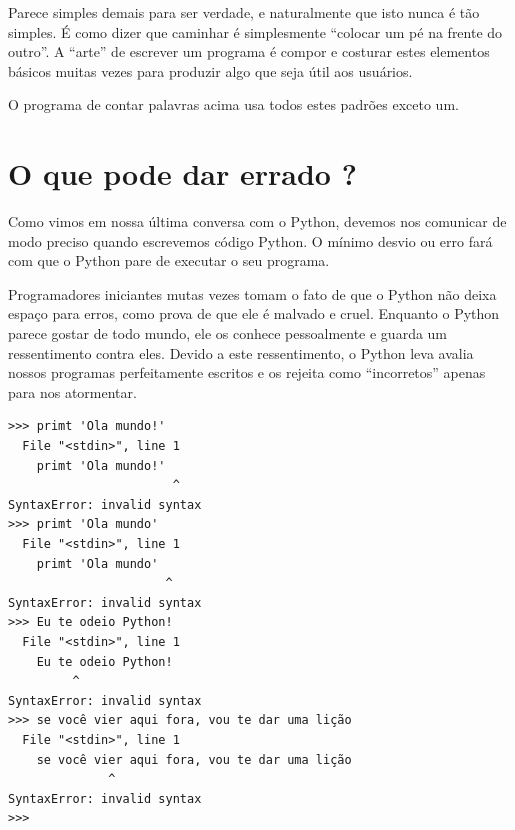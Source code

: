 Parece simples demais para ser verdade, e naturalmente que isto nunca
é tão simples. É como dizer que caminhar é simplesmente ``colocar
um pé na frente do outro''. A ``arte'' de escrever um programa é
compor e costurar estes elementos básicos muitas vezes para produzir
algo que seja útil aos usuários.
%

O programa de contar palavras acima usa todos estes padrões exceto um.
%

\section{O que pode dar errado ?}
%

Como vimos em nossa última conversa com o Python, devemos nos comunicar
de modo preciso quando escrevemos código Python. O mínimo desvio ou erro
fará com que o Python pare de executar o seu programa. 
%

Programadores iniciantes mutas vezes tomam o fato de que o Python não deixa
espaço para erros, como prova de que ele é malvado e cruel.
Enquanto o Python parece gostar de todo mundo, ele os conhece pessoalmente e
guarda um ressentimento contra eles. Devido a este ressentimento, o Python
leva avalia nossos programas perfeitamente escritos e os rejeita como ``incorretos''
apenas para nos atormentar.
%

\beforeverb
\begin{verbatim}
>>> primt 'Ola mundo!'
  File "<stdin>", line 1
    primt 'Ola mundo!'
                       ^
SyntaxError: invalid syntax
>>> primt 'Ola mundo'
  File "<stdin>", line 1
    primt 'Ola mundo'
                      ^
SyntaxError: invalid syntax
>>> Eu te odeio Python!
  File "<stdin>", line 1
    Eu te odeio Python!
         ^
SyntaxError: invalid syntax
>>> se você vier aqui fora, vou te dar uma lição
  File "<stdin>", line 1
    se você vier aqui fora, vou te dar uma lição
              ^
SyntaxError: invalid syntax
>>> 
\end{verbatim}
\afterverb

